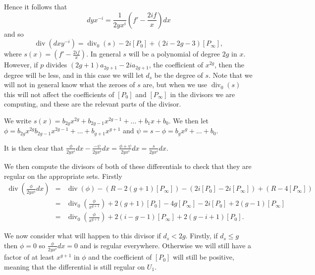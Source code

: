 \documentclass[draft, 11pt]{article} %
\theoremstyle{plain}
\theoremstyle{remark}
\DeclareMathOperator{\di}{div}
\begin{document}
Hence it follows that 
\begin{equation*}
dyx^{-i} = \frac{1}{2yx^{i}}\left( f' - \frac{2if}{x} \right) dx
\end{equation*}
and so
\[
\di (dxy^{-i}) = \di_0(s) -2i[P_0] +(2i-2g-3)[P_\infty],
\]
where $s(x) = \left ( f'-\frac{2if}{x} \right )$.
In general $s$ will be a polynomial of degree $2g$ in $x$.
However, if $p$ divides $(2g+1)a_{2g+1}- 2ia_{2g+1}$, the coefficient of $x^{2g}$, then the degree will be less, and in this case we will let $d_s$ be the degree of $s$.
Note that we will not in general know what the zeroes of $s$ are, but when we use $\di_0(s)$ this will not affect the coefficients of $[P_0]$ and $[P_\infty]$ in the divisors we are computing, and these are the relevant parts of the divisor.
\begin{comment}
We could try writing $dyx^{-i}$ as $\frac{1}{2yx^i}dx - (1-s)\frac{1}{2yx^i}dx$.
We then  have 
\[
\di \left( \frac{1}{2yx^i}dx\right) = -\di(y) - \di(x^i) + \di(dx) = (2g+2i-2)[P_\infty] - 2i[P_0]
\]
which has the correct pole at $P_0$ and is otherwise regular.

On the other hand we have
\[
\di\left((1-s)\frac{1}{2yx^i}\right ) dx = \di_0(1-s) -4g[P_\infty] +2(g+i-1)[P_\infty]-2i[P_0] = \di_0(1-s) +2(i-g-1)[P_\infty] - 2i[P_0].
\]

\end{comment}



We write $s(x) = b_{2g}x^{2g} + b_{2g-1}x^{2g-1} + \ldots + b_1x + b_0$.
We then let $\phi = b_{2g} x^{2g} b_{2g-1}x^{2g-1} + \ldots + b_{g+1}x^{g+1} $ and $\psi = s - \phi = b_gx^g + \ldots + b_0$.

It is then clear that $\frac{\phi }{2yx^i}dx - \frac{-\psi}{2yx^i}dx = \frac{\phi + \psi}{2yx^i}dx = \frac{s}{2yx^i}dx$.

We then compute the divisors of both of these differentials to check that they are regular on the appropriate sets.
Firstly
\begin{eqnarray*}
\di\left( \frac{\phi}{2yx^i}dx \right) & = & \di(\phi) - ( R - 2(g+1)[P_\infty]) - (2i[P_0] - 2i[P_\infty]) + (R - 4[P_\infty]) \\
& = & \di_0\left( \frac{\phi}{x^{g+1}}\right) + 2(g+1)[P_0] - 4g[P_\infty] - 2i[P_0] + 2(g-1)[P_\infty] \\
& = & \di_0\left( \frac{\phi}{x^{g+1}} \right) + 2(i-g-1)[P_\infty] + 2(g-i+1)[P_0].
\end{eqnarray*}

We now consider what will happen to this divisor if $d_s < 2g$.
Firstly, if $d_s \leq g$ then $\phi = 0$ so $\frac{\phi}{2yx^i}dx = 0$ and is regular everywhere.
Otherwise we will still have a factor of at least $x^{g+1}$ in $\phi$ and the coefficient of $[P_0]$ will still be positive, meaning that the differential is still regular on $U_1$.
\end{document}
